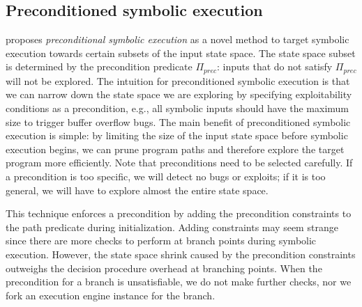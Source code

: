 


\subsection{Preconditioned symbolic execution}
\label{precontioned-symbolic-execution}

\cite{AEG-NDSS11} proposes {\em preconditional symbolic execution} as a novel method to target symbolic execution towards certain subsets of the input state space. The state space subset is determined by the precondition predicate $\Pi_{prec}$: inputs that do not satisfy $\Pi_{prec}$ will not be explored. The intuition for preconditioned symbolic execution is that we can narrow down the state space we are exploring by specifying exploitability conditions as a precondition, e.g., all symbolic inputs should have the maximum size to trigger buffer overflow bugs. The main benefit of preconditioned symbolic execution is simple: by limiting the size of the input state space before symbolic execution begins, we can prune program paths and therefore explore the target program more efficiently.
Note that preconditions need to be selected carefully. If a precondition is too specific, we will detect no bugs or exploits; if it is too general, we will have to explore almost the entire state space. %

This technique enforces a precondition by adding the precondition constraints to the path predicate during initialization. Adding constraints may seem strange since there are more checks to perform at branch points during symbolic execution. However, the state space shrink caused by the precondition constraints outweighs the decision procedure overhead at branching points. When the precondition for a branch is unsatisfiable, we do not make further checks, nor we fork an execution engine instance for the branch.%

